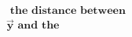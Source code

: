 \documentclass[preview]{standalone}
\begin{document}
\begin{align*}
\,\, \textbf{the distance between} \\ \mathbf{\vec{y}} \,\, \textbf{and the} \,\,
\end{align*}
\end{document}
